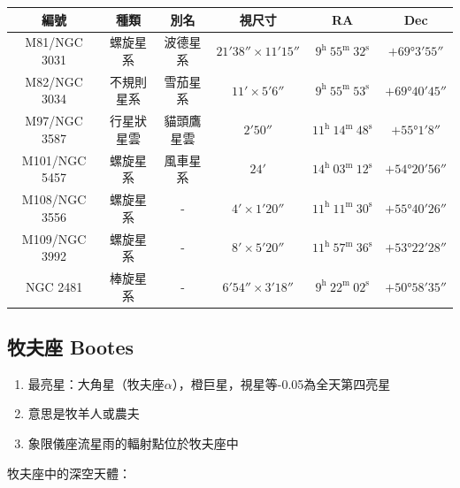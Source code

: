 \begin{center}
\begin{longtable}{c | c | c | c | c | c}
    編號 & 種類 & 別名 & 視尺寸 & RA & Dec \\
    \hline
    \endfirsthead


    \endfoot

    \endlastfoot

    M81/NGC 3031 & 螺旋星系 & 波德星系 & \(\ang{;21;38}\times\ang{;11;15}\) & \(9^\text{h }55^\text{m }32^\text{s}\) & \(+\ang{69;3;55}\) \\
    M82/NGC 3034 & 不規則星系 & 雪茄星系 & \(\ang{;11;}\times\ang{;5;6}\) & \(9^\text{h }55^\text{m }53^\text{s}\) & \(+\ang{69;40;45}\) \\
    M97/NGC 3587 & 行星狀星雲 & 貓頭鷹星雲 & \(\ang{;2;50}\) & \(11^\text{h }14^\text{m }48^\text{s}\) & \(+\ang{55;1;8}\) \\
    M101/NGC 5457 & 螺旋星系 & 風車星系 & \(\ang{;24;}\) & \(14^\text{h }03^\text{m }12^\text{s}\) & \(+\ang{54;20;56}\) \\
    M108/NGC 3556 & 螺旋星系 & - & \(\ang{;4;}\times\ang{;1;20}\) & \(11^\text{h }11^\text{m }30^\text{s}\) & \(+\ang{55;40;26}\) \\
    M109/NGC 3992 & 螺旋星系 & - & \(\ang{;8;}\times\ang{;5;20}\) & \(11^\text{h }57^\text{m }36^\text{s}\) & \(+\ang{53;22;28}\) \\
    NGC 2481 & 棒旋星系 & - & \(\ang{;6;54}\times\ang{;3;18}\) & \(9^\text{h }22^\text{m }02^\text{s}\) & \(+\ang{50;58;35}\) \\
\end{longtable}
\end{center}

\subsection{牧夫座 Bootes}
\begin{enumerate}
    \item 最亮星：大角星（牧夫座\(\alpha\)），橙巨星，視星等-0.05為全天第四亮星
    \item 意思是牧羊人或農夫
    \item 象限儀座流星雨的輻射點位於牧夫座中
\end{enumerate}
牧夫座中的深空天體：

